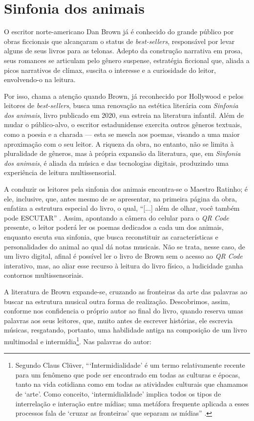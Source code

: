 \documentclass[portuguese]{textolivre}
\begin{document}
\section{Sinfonia dos animais}\label{sec-fmt-manuscrito}

O escritor norte-americano Dan Brown já é conhecido do grande público por obras
ficcionais que alcançaram o status de \textit{best-sellers}, responsável por
levar alguns de seus livros para as telonas. Adepto da construção narrativa em
prosa, seus romances se articulam pelo gênero suspense, estratégia ficcional
que, aliada a picos narrativos de clímax, suscita o interesse e a curiosidade
do leitor, envolvendo-o na leitura.

Por isso, chama a atenção quando Brown, já reconhecido por Hollywood e pelos
leitores de \textit{best-sellers}, busca uma renovação na estética literária
com \textit{Sinfonia dos animais}, livro publicado em 2020, sua estreia na
literatura infantil. Além de mudar o público-alvo, o escritor estadunidense
exercita outros gêneros textuais, como a poesia e a charada — esta se mescla
aos poemas, visando a uma maior aproximação com o seu leitor. A riqueza da
obra, no entanto, não se limita à pluralidade de gêneros, mas à própria
expansão da literatura, que, em \textit{Sinfonia dos animais}, é aliada da
música e das tecnologias digitais, produzindo uma experiência de leitura
multissensorial.

A conduzir os leitores pela sinfonia dos animais encontra-se o Maestro Ratinho;
é ele, inclusive, que, antes mesmo de se apresentar, na primeira página da
obra, enfatiza a estrutura especial do livro, o qual, “[...] além de olhar,
você também pode ESCUTAR” \cite[s/p, destaque do autor]{brown_sinfonia_2020}.
Assim, apontando a câmera do celular para o \textit{QR Code} presente, o leitor
poderá ler os poemas dedicados a cada um dos animais, enquanto escuta sua
sinfonia, que busca reconstituir as características e personalidades do animal
ao qual dá notas musicais. Não se trata, nesse caso, de um livro digital,
afinal é possível ler o livro de Brown sem o acesso ao \textit{QR Code}
interativo, mas, ao aliar esse recurso à leitura do livro físico, a ludicidade
ganha contornos multissensoriais. 

A literatura de Brown expande-se, cruzando as fronteiras da arte das palavras
ao buscar na estrutura musical outra forma de realização. Descobrimos, assim,
conforme nos confidencia o próprio autor ao final do livro, quando reserva umas
palavras aos seus leitores, que, muito antes de escrever histórias, ele
escrevia músicas, resgatando, portanto, uma habilidade antiga na composição de
um livro multimodal e intermídia\footnote{Segundo Claus Clüver,
“‘Intermidialidade’ é um termo relativamente recente para um fenômeno que pode
ser encontrado em todas as culturas e épocas, tanto na vida cotidiana como em
todas as atividades culturais que chamamos de ‘arte’. Como conceito,
‘intermidialidade’ implica todos os tipos de interrelação e interação entre
mídias; uma metáfora frequente aplicada a esses processos fala de ‘cruzar as
fronteiras’ que separam as mídias” \cite[p.~9]{cluver_intermidialidade_2011}.}.
Nas palavras do autor:
\end{document}
